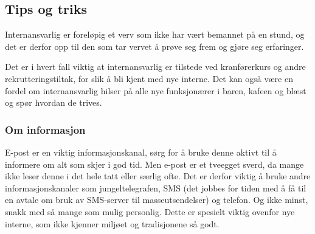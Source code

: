\subsection{Tips og triks}
Internansvarlig er foreløpig et verv som ikke har vært bemannet
på en stund, og det er derfor opp til den som tar vervet å prøve
seg frem og gjøre seg erfaringer.

Det er i hvert fall viktig at internansvarlig er tilstede ved
kranførerkurs og andre rekrutteringstiltak, for slik å bli kjent
med nye interne. Det kan også være en fordel om internansvarlig
hilser på alle nye funksjonærer i baren, kafeen og blæst og
spør hvordan de trives.

\subsubsection{Om informasjon}
E-post er en viktig informasjonskanal, sørg for å bruke denne
aktivt til å informere om alt som skjer i god tid. Men e-post er
et tveegget sverd, da mange ikke leser denne i det hele tatt eller særlig
ofte. Det er derfor viktig å bruke andre informasjonskanaler som
jungeltelegrafen, SMS (det jobbes for tiden med å få til en avtale om bruk
av SMS-server til masseutsendelser) og telefon. Og ikke minst, snakk
med så mange som mulig personlig. Dette er spesielt viktig ovenfor
nye interne, som ikke kjenner miljøet og tradisjonene så godt.
